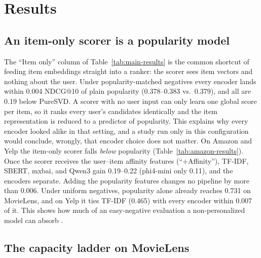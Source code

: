 \section{Results}
\label{sec:results}

\begin{table}[t]
\centering
\caption{MovieLens NDCG@10 (LGBMRanker, mean $\pm$ 95\% CI over 5 seeds).
Columns add scorer features left to right under popularity-matched
negatives; the last column uses uniform negatives. Popularity and PureSVD
use no item text.}
\label{tab:main-results}

\end{table}

\subsection{An item-only scorer is a popularity model}
\label{sec:movielens-results}
The ``Item only'' column of Table~\ref{tab:main-results} is the common
shortcut of feeding item embeddings straight into a ranker: the scorer
sees item vectors and nothing about the user. Under popularity-matched
negatives every encoder lands within 0.004 NDCG@10 of plain popularity
(0.378--0.383 vs.\ 0.379), and all are 0.19 below PureSVD. A scorer with no user
input can only learn one global score per item, so it ranks every
user's candidates identically and the item representation is reduced to
a predictor of popularity. This explains why every encoder looked alike
in that setting, and a study run only in this configuration would
conclude, wrongly, that encoder choice does not matter. On Amazon and
Yelp the item-only scorer falls \emph{below} popularity
(Table~\ref{tab:amazon-results}). Once the scorer receives the user--item affinity
features (``+Affinity''), TF-IDF, SBERT, mxbai, and Qwen3 gain 0.19--0.22
(phi4-mini only 0.11), and the encoders separate. Adding the popularity features changes no pipeline
by more than 0.006. Under uniform negatives, popularity alone already
reaches 0.731 on MovieLens, and on Yelp it ties TF-IDF (0.465) with every
encoder within 0.007 of it. This shows how much of an easy-negative
evaluation a non-personalized model can absorb \cite{krichene-sampled}.

\subsection{The capacity ladder on MovieLens}
\label{sec:cross-dataset-synthesis}
\begin{table}[t]
\centering
\caption{Paired per-user tests against SBERT, all datasets and scorers
(personalized scorer, popularity-matched negatives, 5 seeds). Cells are
NDCG@10 of the pipeline minus SBERT. $^{*}$: Holm-corrected $p<0.05$;
$^{\equiv}$: TOST-equivalent within $\pm0.01$; unmarked: inconclusive.}
\label{tab:scorer-comparison}
\resizebox{\columnwidth}{!}{}
\end{table}

